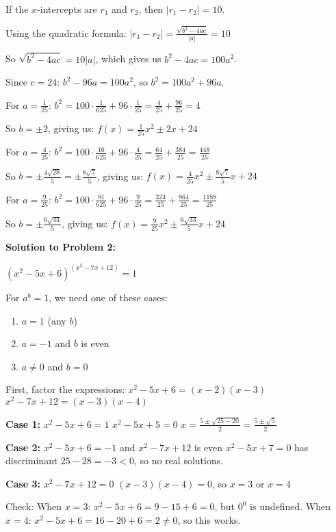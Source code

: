 \documentclass[12pt]{article}
\begin{document}
If the $x$-intercepts are $r_1$ and $r_2$, then $|r_1 - r_2| = 10$.

Using the quadratic formula: $|r_1 - r_2| = \frac{\sqrt{b^2 - 4ac}}{|a|} = 10$

So $\sqrt{b^2 - 4ac} = 10|a|$, which gives us $b^2 - 4ac = 100a^2$.

Since $c = 24$: $b^2 - 96a = 100a^2$, so $b^2 = 100a^2 + 96a$.

For $a = \frac{1}{25}$: $b^2 = 100 \cdot \frac{1}{625} + 96 \cdot \frac{1}{25} = \frac{4}{25} + \frac{96}{25} = 4$

So $b = \pm 2$, giving us: $f(x) = \frac{1}{25}x^2 \pm 2x + 24$

For $a = \frac{4}{25}$: $b^2 = 100 \cdot \frac{16}{625} + 96 \cdot \frac{4}{25} = \frac{64}{25} + \frac{384}{25} = \frac{448}{25}$

So $b = \pm \frac{4\sqrt{28}}{5} = \pm \frac{8\sqrt{7}}{5}$, giving us: $f(x) = \frac{4}{25}x^2 \pm \frac{8\sqrt{7}}{5}x + 24$

For $a = \frac{9}{25}$: $b^2 = 100 \cdot \frac{81}{625} + 96 \cdot \frac{9}{25} = \frac{324}{25} + \frac{864}{25} = \frac{1188}{25}$

So $b = \pm \frac{6\sqrt{33}}{5}$, giving us: $f(x) = \frac{9}{25}x^2 \pm \frac{6\sqrt{33}}{5}x + 24$

\textbf{Solution to Problem 2:}

$(x^2 - 5x + 6)^{(x^2 - 7x + 12)} = 1$

For $a^b = 1$, we need one of these cases:
\begin{enumerate}
\item $a = 1$ (any $b$)
\item $a = -1$ and $b$ is even
\item $a \neq 0$ and $b = 0$
\end{enumerate}

First, factor the expressions:
$x^2 - 5x + 6 = (x-2)(x-3)$
$x^2 - 7x + 12 = (x-3)(x-4)$

\textbf{Case 1:} $x^2 - 5x + 6 = 1$
$x^2 - 5x + 5 = 0$
$x = \frac{5 \pm \sqrt{25-20}}{2} = \frac{5 \pm \sqrt{5}}{2}$

\textbf{Case 2:} $x^2 - 5x + 6 = -1$ and $x^2 - 7x + 12$ is even
$x^2 - 5x + 7 = 0$ has discriminant $25 - 28 = -3 < 0$, so no real solutions.

\textbf{Case 3:} $x^2 - 7x + 12 = 0$
$(x-3)(x-4) = 0$, so $x = 3$ or $x = 4$

Check: When $x = 3$: $x^2 - 5x + 6 = 9 - 15 + 6 = 0$, but $0^0$ is undefined.
When $x = 4$: $x^2 - 5x + 6 = 16 - 20 + 6 = 2 \neq 0$, so this works.
\end{document}
